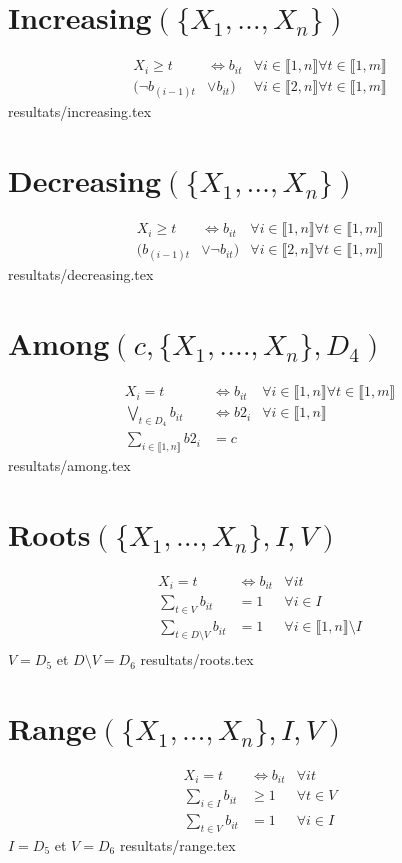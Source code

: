 \documentclass{article}
\newcommand{\increasing}{Increasing$(\{X_1,\ldots,X_n\})~$}
\newcommand{\decreasing}{Decreasing$(\{X_1,\ldots,X_n\})~$}
\newcommand{\roots}{Roots$(\{X_1,\ldots,X_n\},I,V)~$}
\newcommand{\range}{Range$(\{X_1,\ldots,X_n\},I,V)~$}
\newcommand{\among}{Among$(c,\{X_1,.\ldots,X_n\},D_4)~$}
\newcommand{\I}{i\in\llbracket1,n\rrbracket}
\newcommand{\T}{t\in\llbracket1,m\rrbracket}
\newcommand{\fai}{\forall\I}
\newcommand{\fat}{\forall\T}
\newcommand{\fit}{\fai\fat}
\begin{document}
\section{\texorpdfstring{\increasing}{increasing}}
\begin{align*}
    X_i \geq t & \iff b_{it}&\fit\\
    (\neg b_{(i-1)t} & \vee b_{it})&\forall i\in\llbracket2,n\rrbracket\fat 
\end{align*}
{resultats/increasing.tex}

\section{\texorpdfstring{\decreasing}{decreasing}}
\begin{align*}
    X_i \geq t & \iff b_{it}&\fit\\
    (b_{(i-1)t} & \vee \neg b_{it})&\forall i\in\llbracket2,n\rrbracket\fat 
\end{align*}
{resultats/decreasing.tex}

\section{\texorpdfstring{\among}{among}}
\begin{align*}
    X_i =t & \iff b_{it}&\fit\\
    \bigvee_{t\in D_4}b_{it}&\iff b2_i&\fai\\
    \sum_{\I}b2_i & =c
\end{align*}
{resultats/among.tex}

\section{\texorpdfstring{\roots}{roots}}
\begin{align*}
    X_i=t &\iff b_{it}&\forall it\\
    \sum_{t\in V}b_{it} & =1&\forall i \in I\\
    \sum_{t\in D \setminus V}b_{it} & =1&\forall i \in \llbracket1,n\rrbracket \setminus I\\
\end{align*}
$V=D_5$ et $D \setminus V=D_6$
{resultats/roots.tex}

\section{\texorpdfstring{\range}{range}}
\begin{align*}
    X_i=t &\iff b_{it}&\forall it\\
    \sum_{i\in I}b_{it} & \geq 1 &\forall t\in V\\
    \sum_{t\in V}b_{it} & =1&\forall i \in I
\end{align*}
$I=D_5$ et $V=D_6$
{resultats/range.tex}
\end{document}
